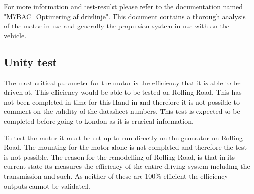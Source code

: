 For more information and test-resulst please refer to the documentation named "M7BAC\_Optimering af drivlinje"\cite{BAC_zenith33}. This document contains a thorough analysis of the motor in use and generally the propulsion system in use with on the vehicle.  

\subsection{Unity test}
The most critical parameter for the motor is the efficiency that it is able to be driven at. This efficiency would be able to be tested on Rolling-Road. This has not been completed in time for this Hand-in and therefore it is not possible to comment on the validity of the datasheet numbers. This test is expected to be completed before going to London as it is crucical information. 

To test the motor it must be set up to run directly on the generator on Rolling Road. The mounting for the motor alone is not completed and therefore the test is not possible. The reason for the remodelling of Rolling Road, is that in its current state its measures the efficiency of the entire driving system including the transmission and such. As neither of these are 100\% efficient the efficiency outputs cannot be validated. 